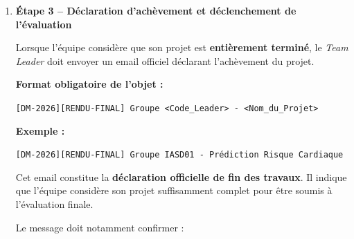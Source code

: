 \documentclass[11pt,a4paper]{article}
\begin{document}
\begin{tcolorbox}[
    colback=sintefblue!8,
    colframe=sintefblue,
    title=\textbf{DIRECTIVES OFFICIELLES DE COMMUNICATION, DE SUIVI ET DE RENDU},
    arc=2mm,
    boxrule=0.8pt,
    breakable
]
\begin{enumerate}[leftmargin=*]
    \textbf{Mauvais exemple :}

    \begin{quote}
        ``Notre code ne marche pas. Pouvez-vous nous aider ?''
    \end{quote}

    \textbf{Bon exemple :}

    \begin{quote}
        ``Après l'application de StandardScaler sur les variables numériques,
        notre modèle SVM produit une accuracy de 0.61 alors que sans
        standardisation nous obtenons 0.78. Nous avons vérifié les valeurs
        manquantes et les types des variables. Vous trouverez ci-joint le
        résultat ainsi que l'extrait du pipeline utilisé.''
    \end{quote}

    Une question clairement formulée permet une réponse plus rapide et plus
    pertinente.

    \item \textbf{Étape 3 -- Déclaration d'achèvement et déclenchement de l'évaluation}

    Lorsque l'équipe considère que son projet est \textbf{entièrement terminé},
    le \textit{Team Leader} doit envoyer un email officiel déclarant
    l'achèvement du projet.

    \textbf{Format obligatoire de l'objet :}

    \begin{center}
        \texttt{[DM-2026][RENDU-FINAL] Groupe <Code\_Leader> - <Nom\_du\_Projet>}
    \end{center}

    \textbf{Exemple :}

    \begin{center}
        \texttt{[DM-2026][RENDU-FINAL] Groupe IASD01 - Prédiction Risque Cardiaque}
    \end{center}

    Cet email constitue la \textbf{déclaration officielle de fin des travaux}.
    Il indique que l'équipe considère son projet suffisamment complet pour être
    soumis à l'évaluation finale.

    Le message doit notamment confirmer :


\end{enumerate}
\end{tcolorbox}
\end{document}
